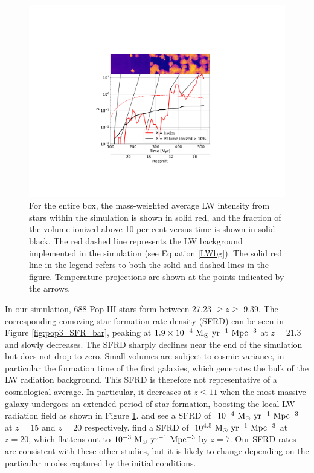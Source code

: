 \documentclass[fleqn,usenatbib]{mnras}
\begin{document}
\begin{figure}
	\includegraphics[width=\columnwidth]{images/jlw_xe_bg_mass_weight.pdf}
    \caption{For the entire box, the mass-weighted average LW intensity from stars within the simulation is shown in solid red, and the fraction of the volume ionized above 10 per cent versus time is shown in solid black. The red dashed line represents the LW background implemented in the simulation (see Equation \ref{LWbg}). The solid red line in the legend refers to both the solid and dashed lines in the figure. Temperature projections are shown at the points indicated by the arrows.}
    \label{fig:JLW_xe_mass}
\end{figure}

In our simulation, 688 Pop III stars form between 27.23 $\geq z \geq$ 9.39. The corresponding comoving star formation rate density (SFRD) can be seen in Figure \ref{fig:pop3_SFR_bar}, peaking at $1.9 \times 10^{-4} \ \rm M_{\odot} \ yr^{-1} \ Mpc^{-3}$ at $z = 21.3$ and slowly decreases. The SFRD sharply declines near the end of the simulation but does not drop to zero. Small volumes are subject to cosmic variance, in particular the formation time of the first galaxies, which generates the bulk of the LW radiation background.  This SFRD is therefore not representative of a cosmological average.  In particular, it decreases at $z \le 11$ when the most massive galaxy undergoes an extended period of star formation, boosting the local LW radiation field as shown in Figure \ref{fig:JLW_xe_mass}. \citet{Xu13} and \citet{Magg16} see a SFRD of $~10^{-4}~\rm M_{\odot} \ yr^{-1} \ Mpc^{-3}$ at $z = 15$ and $z = 20$ respectively. \citet{Jaacks19} find a SFRD of $~10^{4.5}~\rm M_{\odot} \ yr^{-1} \ Mpc^{-3}$ at $z = 20$, which flattens out to $10^{-3}~\rm M_{\odot} \ yr^{-1} \ Mpc^{-3}$ by $z =7$. Our SFRD rates are consistent with these other studies, but it is likely to change depending on the particular modes captured by the initial conditions.
\end{document}
